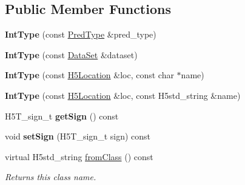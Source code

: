 \subsection*{Public Member Functions}
\begin{DoxyCompactItemize}
\item 
\mbox{\label{class_h5_1_1_int_type_ae490ae5914c745c2b37a4909413b8f44}} 
{\bfseries Int\+Type} (const \hyperlink{class_h5_1_1_pred_type}{Pred\+Type} \&pred\+\_\+type)
\item 
\mbox{\label{class_h5_1_1_int_type_aa9d284c2140561b895ee34e5d0fa31fd}} 
{\bfseries Int\+Type} (const \hyperlink{class_h5_1_1_data_set}{Data\+Set} \&dataset)
\item 
\mbox{\label{class_h5_1_1_int_type_a8f436e34f7718a7b05d29f3591d899a8}} 
{\bfseries Int\+Type} (const \hyperlink{class_h5_1_1_h5_location}{H5\+Location} \&loc, const char $\ast$name)
\item 
\mbox{\label{class_h5_1_1_int_type_a621da6b7346da555ba0d00801c833cbb}} 
{\bfseries Int\+Type} (const \hyperlink{class_h5_1_1_h5_location}{H5\+Location} \&loc, const H5std\+\_\+string \&name)
\item 
\mbox{\label{class_h5_1_1_int_type_a3bbae05c5428899c10ae5c32a5ae8c09}} 
H5\+T\+\_\+sign\+\_\+t {\bfseries get\+Sign} () const
\item 
\mbox{\label{class_h5_1_1_int_type_adff7d487f13c90003e702ba1872ac686}} 
void {\bfseries set\+Sign} (H5\+T\+\_\+sign\+\_\+t sign) const
\item 
\mbox{\label{class_h5_1_1_int_type_a8e4d3767868034eeb45d362cd6201adc}} 
virtual H5std\+\_\+string \hyperlink{class_h5_1_1_int_type_a8e4d3767868034eeb45d362cd6201adc}{from\+Class} () const
\begin{DoxyCompactList}\small\item\em Returns this class name. \end{DoxyCompactList}\item 
\mbox{\label{class_h5_1_1_int_type_a9e5ddb1a36be05d38ae6c64a119c6add}} 

\end{DoxyCompactItemize}
